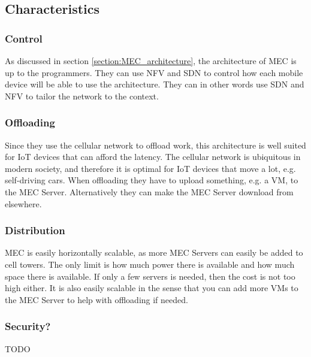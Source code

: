 





\subsection{Characteristics}
\subsubsection{Control}
As discussed in section \ref{section:MEC_architecture}, the architecture of MEC is up to the programmers. They can use NFV and SDN to control how each mobile device will be able to use the architecture. They can in other words use SDN and NFV to tailor the network to the context.
\subsubsection{Offloading}
Since they use the cellular network to offload work, this architecture is well suited for IoT devices that can afford the latency. The cellular network is ubiquitous in modern society, and therefore it is optimal for IoT devices that move a lot, e.g. self-driving cars. When offloading they have to upload something, e.g. a VM, to the MEC Server. Alternatively they can make the MEC Server download from elsewhere.
\subsubsection{Distribution}
MEC is easily horizontally scalable, as more MEC Servers can easily be added to cell towers. The only limit is how much power there is available and how much space there is available. If only a few servers is needed, then the cost is not too high either. It is also easily scalable in the sense that you can add more VMs to the MEC Server to help with offloading if needed. 
\subsubsection{Security?}
TODO






